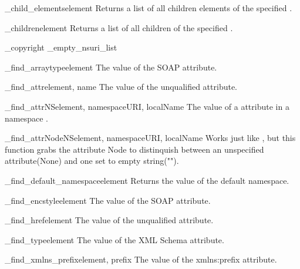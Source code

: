 \begin{funcdesc}{_child_elements}{element}
Returns a list of all children elements of the specified .
\end{funcdesc}

\begin{funcdesc}{_children}{element}
Returns a list of all children of the specified .
\end{funcdesc}

_copyright
_empty_nsuri_list
\begin{funcdesc}{_find_arraytype}{element}
The value of the SOAP  attribute.
\end{funcdesc}

\begin{funcdesc}{_find_attr}{element, name}
The value of the unqualified  attribute.
\end{funcdesc}

\begin{funcdesc}{_find_attrNS}{element, namespaceURI, localName}
The value of a  attribute in a namespace .
\end{funcdesc}

\begin{funcdesc}{_find_attrNodeNS}{element, namespaceURI, localName}
Works just like , but this function grabs the attribute Node to
distinquish between an unspecified attribute(None) and one set to empty
string("").
\end{funcdesc}

\begin{funcdesc}{_find_default_namespace}{element}
Returns the value of the default namespace.
\end{funcdesc}

\begin{funcdesc}{_find_encstyle}{element}
The value of the SOAP  attribute.
\end{funcdesc}

\begin{funcdesc}{_find_href}{element}
The value of the unqualified  attribute.
\end{funcdesc}

\begin{funcdesc}{_find_type}{element}
The value of the XML Schema  attribute.
\end{funcdesc}

\begin{funcdesc}{_find_xmlns_prefix}{element, prefix}
The value of the xmlns:prefix  attribute.
\end{funcdesc}

